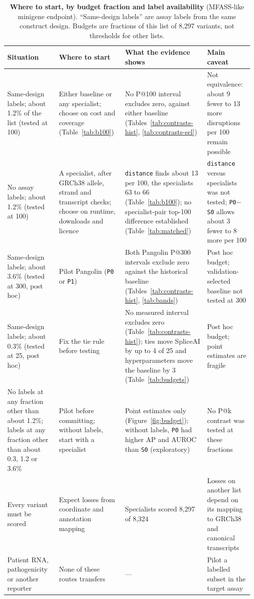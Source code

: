\documentclass[11pt]{article}
\makeatletter
\newcommand{\cfg}[1]{\texttt{#1}}
\newcommand{\pk}[1]{P@#1}
\makeatother
\begin{document}
\begin{table}[t]
\centering
\scriptsize
\caption{\textbf{Where to start, by budget fraction and label availability} (MFASS-like minigene endpoint).
``Same-design labels'' are assay labels from the same construct design. Budgets are fractions of this list of
8,297 variants, not thresholds for other lists.}
\label{tab:glance}
\begin{tabularx}{\linewidth}{@{}>{\raggedright\arraybackslash}p{2.6cm} L L L@{}}
\toprule
Situation & Where to start & What the evidence shows & Main caveat \\
\midrule
Same-design labels; about 1.2\% of the list (tested at 100) & Either baseline or any specialist; choose on cost and coverage (Table~\ref{tab:b100}) & No \pk{100} interval excludes zero, against either baseline (Tables~\ref{tab:contrasts-hist}, \ref{tab:contrasts-sel}) & Not equivalence: about 9 fewer to 13 more disruptions per 100 remain possible \\
No assay labels; about 1.2\% (tested at 100) & A specialist, after GRCh38 allele, strand and transcript checks; choose on runtime, downloads and licence & \cfg{distance} finds about 13 per 100, the specialists 63 to 66 (Table~\ref{tab:b100}); no specialist-pair top-100 difference established (Table~\ref{tab:matched}) & \cfg{distance} versus specialists was not tested; \cfg{P0}$-$\cfg{S0} allows about 3 fewer to 8 more per 100 \\
Same-design labels; about 3.6\% (tested at 300, post hoc) & Pilot Pangolin (\cfg{P0} or \cfg{P1}) & Both Pangolin \pk{300} intervals exclude zero against the historical baseline (Tables~\ref{tab:contrasts-hist}, \ref{tab:bands}) & Post hoc budget; validation-selected baseline not tested at 300 \\
Same-design labels; about 0.3\% (tested at 25, post hoc) & Fix the tie rule before testing & No measured interval excludes zero (Table~\ref{tab:contrasts-hist}); ties move SpliceAI by up to 4 of 25 and hyperparameters move the baseline by 3 (Table~\ref{tab:budgets}) & Post hoc budget; point estimates are fragile \\
No labels at any fraction other than about 1.2\%; labels at any fraction other than about 0.3, 1.2 or 3.6\% & Pilot before committing; without labels, start with a specialist & Point estimates only (Figure~\ref{fig:budget}); without labels, \cfg{P0} had higher AP and AUROC than \cfg{S0} (exploratory) & No \pk{k} contrast was tested at these fractions \\
Every variant must be scored & Expect losses from coordinate and annotation mapping & Specialists scored 8,297 of 8,324 & Losses on another list depend on its mapping to GRCh38 and canonical transcripts \\
Patient RNA, pathogenicity or another reporter & None of these routes transfers & --- & Pilot a labelled subset in the target assay \\
\bottomrule
\end{tabularx}
\end{table}
\end{document}
